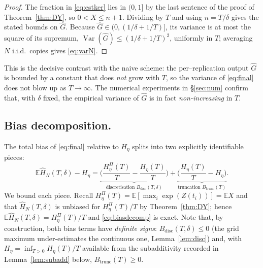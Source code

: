 \documentclass{amsart}
\theoremstyle{definition}
\DeclareMathOperator{\Var}{Var}
\newcommand{\E}{\mathbb{E}}
\begin{document}
\begin{proof}
The fraction in \eqref{eq:estker} lies in $(0,1]$ by the last sentence of the
proof of Theorem~\ref{thm:DY}, so $0<X\le n+1$. Dividing by $T$ and using
$n=T/\delta$ gives the stated bounds on $\widehat G$.
Because $\widehat G\in(0,(1/\delta+1/T)]$, its variance is at most the square of
its supremum, $\Var(\widehat G)\le(1/\delta+1/T)^2$, uniformly in $T$; averaging
$N$ i.i.d.\ copies gives \eqref{eq:varN}.
\end{proof}

This is the decisive contrast with the naive scheme: the per--replication output
$\widehat G$ is bounded by a constant that does \emph{not} grow with $T$, so the
variance of \eqref{eq:final} does not blow up as $T\to\infty$. The numerical
experiments in \S\ref{sec:num} confirm that, with $\delta$ fixed, the empirical
variance of $\widehat G$ is in fact \emph{non-increasing} in $T$.

\subsection{Bias decomposition.}

The total bias of \eqref{eq:final} relative to $H_\eta$ splits into two
explicitly identifiable pieces:
\begin{equation}\label{eq:biasdecomp}
   \E\widehat H_N(T,\delta)-H_\eta
   =\underbrace{\Big(\frac{H_\eta^{\Pi}(T)}{T}-\frac{H_\eta(T)}{T}\Big)}_{\text{discretisation }B_{\mathrm{disc}}(T,\delta)}
   +\underbrace{\Big(\frac{H_\eta(T)}{T}-H_\eta\Big)}_{\text{truncation }B_{\mathrm{trunc}}(T)} .
\end{equation}
We bound each piece. Recall $H_\eta^{\Pi}(T)=\E[\max_i\exp(Z(t_i))]=\E X$ and that
$\widehat H_N(T,\delta)$ is unbiased for $H_\eta^{\Pi}(T)/T$ by
Theorem~\ref{thm:DY}; hence $\E\widehat H_N(T,\delta)=H_\eta^{\Pi}(T)/T$ and
\eqref{eq:biasdecomp} is exact. Note that, by construction, both bias terms have
\emph{definite signs}: $B_{\mathrm{disc}}(T,\delta)\le 0$ (the grid maximum
under-estimates the continuous one, Lemma~\ref{lem:disc}) and, with
$H_\eta=\inf_{T>0}H_\eta(T)/T$ available from the subadditivity recorded in
Lemma~\ref{lem:subadd} below, $B_{\mathrm{trunc}}(T)\ge0$.
\end{document}
